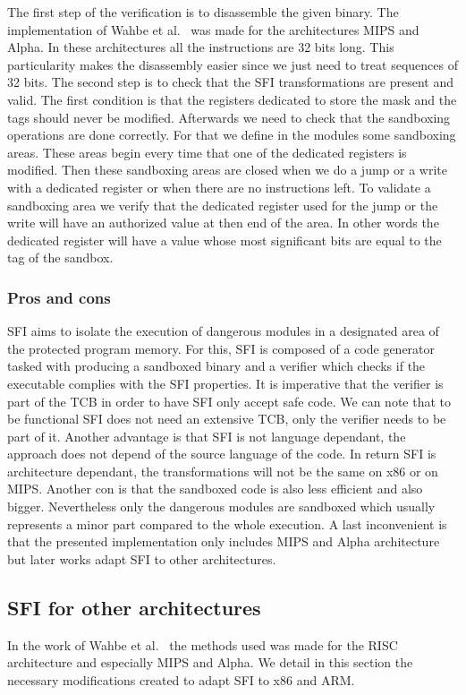 \documentclass[11pt]{sdm}
\begin{document}
The first step of the verification is to disassemble the given binary. The implementation of Wahbe et al.~\cite{Wahbe:1993:ESF:173668.168635} was made for the architectures MIPS and Alpha. In these architectures all the instructions are 32 bits long. This particularity makes the disassembly easier since we just need to treat sequences of 32 bits. The second step is to check that the SFI transformations are present and valid. The first condition is that the registers dedicated to store the mask and the tags should never be modified. Afterwards we need to check that the sandboxing operations are done correctly. For that we define in the modules some sandboxing areas. These areas begin every time that one of the dedicated registers is modified. Then these sandboxing areas are closed when we do a jump or a write with a dedicated register or when there are no instructions left. To validate a sandboxing area we verify that the dedicated register used for the jump or the write will have an authorized value at then end of the area. In other words the dedicated register will have a value whose most significant bits are equal to the tag of the sandbox.

\subsubsection{Pros and cons}
\label{ssub:Pros and cons}

SFI aims to isolate the execution of dangerous modules in a designated area of the protected program memory. For this, SFI is composed of a code generator tasked with producing a sandboxed binary and a verifier which checks if the executable complies with the SFI properties.
It is imperative that the verifier is part of the TCB in order to have SFI only accept safe code. We can note that to be functional SFI does not need an extensive TCB, only the verifier needs to be part of it. Another advantage is that SFI is not language dependant, the approach does not depend of the source language of the code. In return SFI is architecture dependant, the transformations will not be the same on x86 or on MIPS. Another con is that the sandboxed code is also less efficient and also bigger. Nevertheless only the dangerous modules are sandboxed which usually represents a minor part compared to the whole execution. A last inconvenient is that the presented implementation only includes MIPS and Alpha architecture but later works adapt SFI to other architectures.

\subsection{SFI for other architectures}
\label{sub:sfi_other}
In the work of Wahbe et al.~\cite{Wahbe:1993:ESF:173668.168635} the methods used was made for the RISC architecture and especially MIPS and Alpha. We detail in this section the necessary modifications created to adapt SFI to x86 and ARM.
\end{document}
